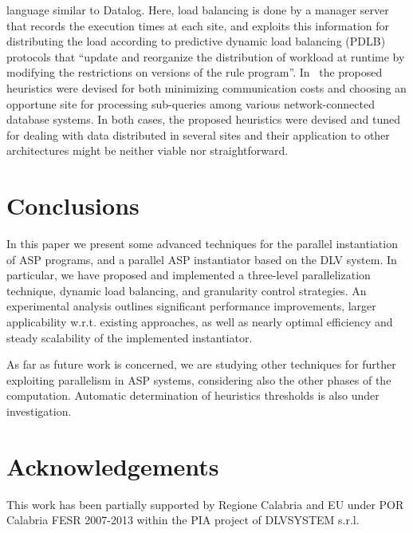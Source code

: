 \documentclass[preprint]{tlp}
\newcommand{\dlv}{{\sc DLV}\xspace}
\begin{document}
language similar to Datalog. Here, load balancing is done by a
manager server that records the execution times at each site, and
exploits this information for distributing the load according to
predictive dynamic load balancing (PDLB) protocols
that ``update and reorganize the distribution of workload at runtime
by modifying the restrictions on versions of the rule program''\cite{dewa-etal-94}.
In~\cite{carey-et-all-86} the proposed heuristics were devised for
both minimizing communication costs and choosing an opportune site
for processing sub-queries among various network-connected database
systems. In both cases, the proposed heuristics were devised and
tuned for dealing with data distributed in several sites and their
application to other architectures might be neither viable nor
straightforward.

\section{Conclusions}\label{sec:conclusion}

In this paper we present some advanced techniques for the parallel instantiation
of ASP programs, and a parallel ASP instantiator based on the \dlv system.
In particular, we have proposed and implemented a three-level parallelization technique, dynamic load balancing, and granularity control strategies.
An experimental analysis outlines significant performance improvements, larger applicability w.r.t. existing approaches,
as well as nearly optimal efficiency and steady scalability of the implemented instantiator.

As far as future work is concerned, we are studying other techniques for further
exploiting parallelism in ASP systems, considering also the other phases of the computation.
Automatic determination of heuristics thresholds is also under investigation.

\section*{Acknowledgements}\label{sec:ack}
This work has been partially supported by Regione Calabria and EU under POR
Calabria FESR 2007-2013 within the PIA project of DLVSYSTEM s.r.l.
\end{document}
